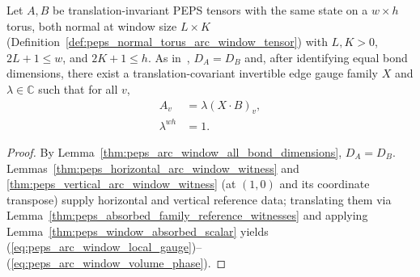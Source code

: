 \begin{lemma}%
    \label{thm:peps_arc_window_covariant_gauge_existence}
    \leanok
    Let $A,B$ be translation-invariant PEPS tensors with the same state on a
    $w\times h$ torus, both normal at window size $L\times K$
    (Definition~\ref{def:peps_normal_torus_arc_window_tensor}) with $L,K>0$,
    $2L+1\leq w$, and $2K+1\leq h$. As in~\cite{Molnar2018NormalPEPS},
    $D_A=D_B$ and, after identifying equal bond dimensions, there exist a
    translation-covariant invertible edge gauge family $X$ and
    $\lambda\in\mathbb C$ such that for all $v$,
    \begin{align}
        A_v          & =\lambda(X\cdot B)_v,\label{eq:peps_arc_window_local_gauge} \\
        \lambda^{wh} & =1.\label{eq:peps_arc_window_volume_phase}
    \end{align}
\end{lemma}
\begin{proof}
    \leanok
    By Lemma~\ref{thm:peps_arc_window_all_bond_dimensions}, $D_A=D_B$.
    Lemmas~\ref{thm:peps_horizontal_arc_window_witness} and
    \ref{thm:peps_vertical_arc_window_witness} (at $(1,0)$ and its coordinate
    transpose) supply horizontal and vertical reference data; translating them via
    Lemma~\ref{thm:peps_absorbed_family_reference_witnesses} and applying
    Lemma~\ref{thm:peps_window_absorbed_scalar} yields
    (\ref{eq:peps_arc_window_local_gauge})--(\ref{eq:peps_arc_window_volume_phase}).
\end{proof}

